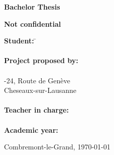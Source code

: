 
\begin{titlepage}
  \thispagestyle{firstpage}
  \begin{center}
    \vspace*{3cm}

    \Huge
    \textbf{Bachelor Thesis}

    \vspace{1cm}
    \Huge
    \TBtitle

    \vspace{0.2cm}
    \Large
    \textbf{Not confidential}
  \end{center}

  \vspace{7cm}
  \begin{tabbing}
    \linespread{3}\textbf{Student:} \hspace{12em} \= \TBauthor\\\\

    \textbf{Project proposed by:} \> \TBindustryContact\\
    \> \TBindustryName\\
    -24, Route de Genève\\
     Cheseaux-sur-Lausanne\\\\

    \textbf{Teacher in charge:} \> \TBsupervisor\\\\

    \textbf{Academic year:} \> \TBacademicYears
  \end{tabbing}

  \vspace{2cm}
  \begin{flushright}
    Combremont-le-Grand, \today
  \end{flushright}
\end{titlepage}

